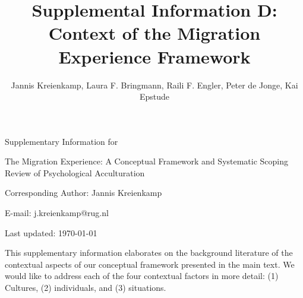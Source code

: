 \documentclass[man, 12pt, a4paper]{apa7}
\title{Supplemental Information D: Context of the Migration Experience Framework}
\author{Jannis Kreienkamp, Laura F. Bringmann, Raili F. Engler, Peter de Jonge, Kai Epstude}
\begin{document}
\begin{titlepage}
	{\noindent\Large Supplementary Information for \par}
	\vspace{0.5cm}
	{\noindent\Large The Migration Experience: A Conceptual Framework and Systematic Scoping Review of Psychological Acculturation\par}
	\vspace{1.5cm}
	{\noindent\LARGE\bfseries \thetitle \par}
	\vspace{2cm}
	{\noindent\Large\itshape \theauthor \par}
	\vfill
	\noindent Corresponding Author: Jannis Kreienkamp\par
	\noindent E-mail: j.kreienkamp@rug.nl\par
	\vfill

	{\noindent Last updated: \today\par}
\end{titlepage}

\begin{center}
   \textbf{\thetitle} 
\end{center}

This supplementary information elaborates on the background literature of the contextual aspects of our conceptual framework presented in the main text. We would like to address each of the four contextual factors in more detail: (1) Cultures, (2) individuals, and (3) situations.

\end{document}
